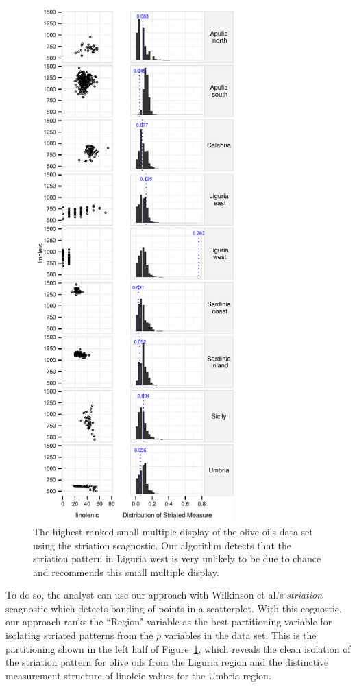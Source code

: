 \begin{figure}[t]
 \centering 
	\includegraphics[width=3.05in]{images/15_729035813077-region.pdf}
	  \caption{The highest ranked small multiple display of the olive oils data set using the striation scagnostic. Our algorithm detects that the striation pattern in Liguria west is very unlikely to be due to chance and recommends this small multiple display. }
	 \label{fig:vrich_sm}
\end{figure}

To do so, the analyst can use our approach with Wilkinson et al.'s \emph{striation} scagnostic which detects banding of points in a scatterplot. With this cognostic, our approach ranks the ``Region" variable as the best partitioning variable for isolating striated patterns from the $p$ variables in the data set. This is the partitioning shown in the left half of Figure~\ref{fig:vrich_sm}, which reveals the clean isolation of the striation pattern for olive oils from the Liguria region and the distinctive measurement structure of linoleic values for the Umbria region.

